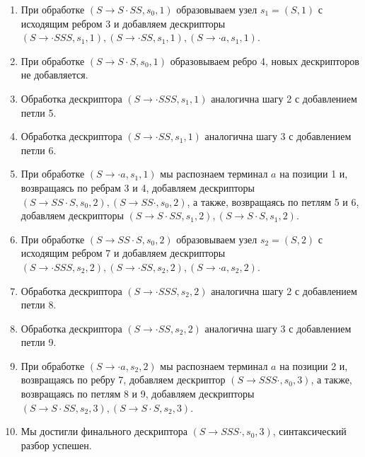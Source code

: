 \begin{example}
\begin{enumerate}
    \item При обработке $ (S \to S \cdot S S, s_0, 1) $ образовываем узел $s_1 = (S, 1)$ с исходящим ребром 3 и добавляем дескрипторы $ (S \to \cdot SSS, s_1, 1), (S \to \cdot SS, s_1, 1), (S \to \cdot a, s_1, 1) $.
    
    \item При обработке $ (S \to S \cdot S, s_0, 1) $ образовываем ребро 4, новых дескрипторов не добавляется.   
     
		\item Обработка дескриптора $ (S \to \cdot S S S, s_1, 1) $ аналогична шагу 2 с добавлением петли 5.
		
		\item Обработка дескриптора $ (S \to \cdot S S, s_1, 1) $ аналогична шагу 3 с добавлением петли 6.
		
		\item При обработке $ (S \to \cdot a, s_1, 1) $ мы распознаем терминал $a$ на позиции 1 и, возвращаясь по ребрам 3 и 4, добавляем дескрипторы $ (S \to S S \cdot S, s_0, 2), (S \to S S \cdot, s_0, 2) $, а также, возвращаясь по петлям 5 и 6, добавляем дескрипторы $ (S \to S \cdot S S, s_1, 2), (S \to S \cdot S, s_1, 2) $.
		
		\item При обработке $ (S \to S S \cdot S, s_0, 2) $ образовываем узел $s_2 = (S, 2)$ с исходящим ребром 7 и добавляем дескрипторы $ (S \to \cdot SSS, s_2, 2), (S \to \cdot SS, s_2, 2), (S \to \cdot a, s_2, 2) $.
		
		\item Обработка дескриптора $ (S \to \cdot S S S, s_2, 2) $ аналогична шагу 2 с добавлением петли 8.
				
		\item Обработка дескриптора $ (S \to \cdot S S, s_2, 2) $ аналогична шагу 3 с добавлением петли 9.
		
		\item При обработке $ (S \to \cdot a, s_2, 2) $ мы распознаем терминал $a$ на позиции 2 и, возвращаясь по ребру 7, добавляем дескриптор $ (S \to S S S \cdot, s_0, 3) $, а также, возвращаясь по петлям 8 и 9, добавляем дескрипторы $ (S \to S \cdot S S, s_2, 3), (S \to S \cdot S, s_2, 3) $.
		
		\item Мы достигли финального дескриптора $ (S \to S S S \cdot, s_0, 3) $, синтаксический разбор успешен.
  \end{enumerate}

\end{example}

